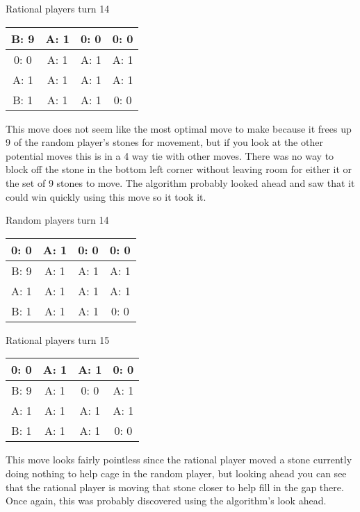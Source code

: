 \documentclass[12pt]{article}
\begin{document}
Rational players turn 14
\begin{center}
\begin{tabular}{|c|c|c|c|} 
\hline
B: 9  & A: 1  & 0: 0  & 0: 0  \\ \hline
0: 0  & A: 1  & A: 1  & A: 1  \\ \hline
A: 1  & A: 1  & A: 1  & A: 1  \\ \hline
B: 1  & A: 1  & A: 1  & 0: 0  \\ \hline
\end{tabular} 
\end{center}
This move does not seem like the most optimal move to make because it frees up 9 of the random player's stones for movement, but if you look at the other potential moves this is in a 4 way tie with other moves. There was no way to block off the stone in the bottom left corner without  leaving room for either it or the set of 9 stones to move. The algorithm probably looked ahead and saw that it could win quickly using this move so it took it.

Random players turn 14
\begin{center}
\begin{tabular}{|c|c|c|c|} 
\hline
0: 0  & A: 1  & 0: 0  & 0: 0  \\ \hline
B: 9  & A: 1  & A: 1  & A: 1  \\ \hline
A: 1  & A: 1  & A: 1  & A: 1  \\ \hline
B: 1  & A: 1  & A: 1  & 0: 0  \\ \hline
\end{tabular} 
\end{center}

Rational players turn 15
\begin{center}
\begin{tabular}{|c|c|c|c|} 
\hline
0: 0  & A: 1  & A: 1  & 0: 0  \\ \hline
B: 9  & A: 1  & 0: 0  & A: 1  \\ \hline
A: 1  & A: 1  & A: 1  & A: 1  \\ \hline
B: 1  & A: 1  & A: 1  & 0: 0  \\ \hline
\end{tabular} 
\end{center}
This move looks fairly pointless since the rational player moved a stone currently doing nothing to help cage in the random player, but looking ahead you can see that the rational player is moving that stone closer to help fill in the gap there. Once again, this was probably discovered using the algorithm's look ahead.
\end{document}

